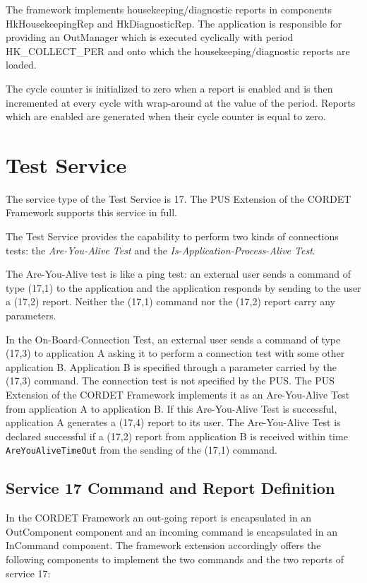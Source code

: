 \documentclass[a4paper,10pt]{article}
\let\stdsection\section
\renewcommand\section{\newpage\stdsection}
\begin{document}
The framework implements housekeeping/diagnostic reports in components HkHousekeepingRep and HkDiagnosticRep. The application is responsible for providing an OutManager which is executed cyclically with period HK\_COLLECT\_PER and onto which the housekeeping/diagnostic reports are loaded.

 The cycle counter is initialized to zero when a report is enabled and is then incremented at every cycle with wrap-around at the value of the period. Reports which are enabled are generated when their cycle counter is equal to zero.




\section{Test Service}\label{sec:serv17}
The service type of the Test Service is 17. The PUS Extension of the CORDET Framework supports this service in full.

The Test Service provides the capability to perform two kinds of connections tests: the \textit{Are-You-Alive Test} and the \textit{Is-Application-Process-Alive Test}.

The Are-You-Alive test is like a ping test: an external user sends a command of type (17,1) to the application and the application responds by sending to the user a (17,2) report. Neither the (17,1) command nor the (17,2) report carry any parameters. 

In the On-Board-Connection Test, an external user sends a command of type (17,3) to application A asking it to perform a connection test with some other application B. Application B is specified through a parameter carried by the (17,3) command. The connection test is not specified by the PUS. The PUS Extension of the CORDET Framework implements it as an Are-You-Alive Test from application A to application B. If this Are-You-Alive Test is successful, application A generates a (17,4) report to its user. The Are-You-Alive Test is declared successful if a (17,2) report from application B is received within time \texttt{AreYouAliveTimeOut} from the sending of the (17,1) command.

\subsection{Service 17 Command and Report Definition}
In the CORDET Framework an out-going report is encapsulated in an OutComponent component and an incoming command is encapsulated in an InCommand component. The framework extension accordingly offers the following components to implement the two commands and the two reports of service 17:
\end{document}
